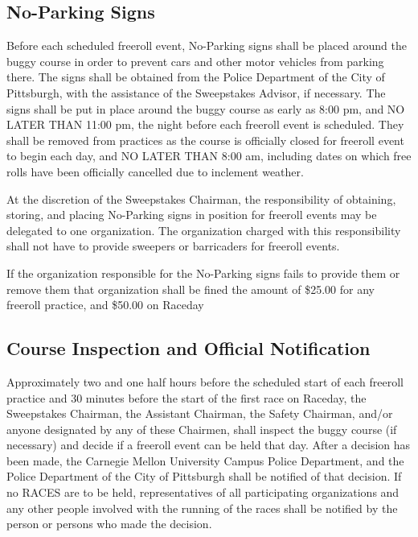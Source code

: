 	
\subsection{No-Parking Signs}

	Before each scheduled freeroll event, No-Parking signs shall be placed
	around the buggy course in order to prevent cars and other motor vehicles from
	parking there. The signs shall be obtained from the Police Department of the
	City of Pittsburgh, with the assistance of the Sweepstakes Advisor, if
	necessary. The signs shall be put in place around the buggy course as early as
	8:00 pm, and NO LATER THAN 11:00 pm, the night before each freeroll event is
	scheduled. They shall be removed from practices as the course is officially closed for
	freeroll event to begin each day, and NO LATER THAN 8:00 am, including dates
	on which free rolls have been officially cancelled due to inclement weather.

	At the discretion of the Sweepstakes Chairman, the responsibility of obtaining,
	storing, and placing No-Parking signs in position for freeroll events may be
	delegated to one organization. The organization charged with this
	responsibility shall not have to provide sweepers or barricaders for freeroll
	events.

	If the organization responsible for the No-Parking signs fails to provide them
	or remove them that organization shall be fined the
	amount of \$25.00 for any freeroll practice, and \$50.00 on Raceday

	
\subsection{Course Inspection and Official Notification}

	Approximately two and one half hours before the scheduled start of each
	freeroll practice and 30 minutes before the start of the first race on Raceday,
	the Sweepstakes Chairman, the Assistant Chairman, the Safety
	Chairman, and/or anyone designated by any of these Chairmen, shall inspect the
	buggy course (if necessary) and decide if a freeroll event can be held that
	day. After a decision has been made, the Carnegie Mellon University Campus
	Police Department, and the Police Department of the City of Pittsburgh shall be
	notified of that decision. If no RACES are to be held,
	representatives of all participating organizations and any other people
	involved with the running of the races shall be notified by the person or
	persons who made the decision.


